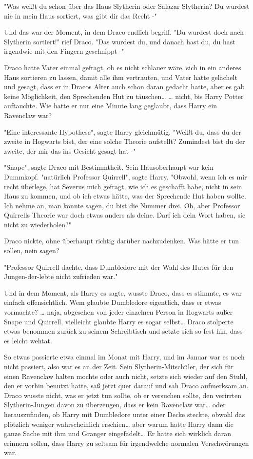 {"Was weißt du schon über das Haus Slytherin oder Salazar Slytherin? Du wurdest nie in mein Haus sortiert, was gibt dir das Recht -"

Und das war der Moment, in dem Draco endlich begriff. "Du wurdest doch nach Slytherin sortiert!" rief Draco. "Das wurdest du, und danach hast du, du hast irgendwie mit den Fingern geschnippt -"

Draco hatte Vater einmal gefragt, ob es nicht schlauer wäre, sich in ein anderes Haus sortieren zu lassen, damit alle ihm vertrauten, und Vater hatte gelächelt und gesagt, dass er in Dracos Alter auch schon daran gedacht hatte, aber es gab keine Möglichkeit, den Sprechenden Hut zu täuschen… … nicht, bis Harry Potter auftauchte. Wie hatte er nur eine Minute lang geglaubt, dass Harry ein Ravenclaw war?

"Eine interessante Hypothese", sagte Harry gleichmütig. "Weißt du, dass du der zweite in Hogwarts bist, der eine solche Theorie aufstellt? Zumindest bist du der zweite, der mir das ins Gesicht gesagt hat -"

"Snape", sagte Draco mit Bestimmtheit. Sein Hausoberhaupt war kein Dummkopf. "natürlich Professor Quirrell", sagte Harry. "Obwohl, wenn ich es mir recht überlege, hat Severus mich gefragt, wie ich es geschafft habe, nicht in sein Haus zu kommen, und ob ich etwas hätte, was der Sprechende Hut haben wollte. Ich nehme an, man könnte sagen, du bist die Nummer drei. Oh, aber Professor Quirrells Theorie war doch etwas anders als deine. Darf ich dein Wort haben, sie nicht zu wiederholen?"

Draco nickte, ohne überhaupt richtig darüber nachzudenken. Was hätte er tun sollen, nein sagen?

"Professor Quirrell dachte, dass Dumbledore mit der Wahl des Hutes für den Jungen-der-lebte nicht zufrieden war."

Und in dem Moment, als Harry es sagte, wusste Draco, dass es stimmte, es war einfach offensichtlich. Wem glaubte Dumbledore eigentlich, dass er etwas vormachte? … naja, abgesehen von jeder einzelnen Person in Hogwarts außer Snape und Quirrell, vielleicht glaubte Harry es sogar selbst… Draco stolperte etwas benommen zurück zu seinem Schreibtisch und setzte sich so fest hin, dass es leicht wehtat.

So etwas passierte etwa einmal im Monat mit Harry, und im Januar war es noch nicht passiert, also war es an der Zeit. Sein Slytherin-Mitschüler, der sich für einen Ravenclaw halten mochte oder auch nicht, setzte sich wieder auf den Stuhl, den er vorhin benutzt hatte, saß jetzt quer darauf und sah Draco aufmerksam an. Draco wusste nicht, was er jetzt tun sollte, ob er versuchen sollte, den verirrten Slytherin-Jungen davon zu überzeugen, dass er kein Ravenclaw war… oder herauszufinden, ob Harry mit Dumbledore unter einer Decke steckte, obwohl das plötzlich weniger wahrscheinlich erschien… aber warum hatte Harry dann die ganze Sache mit ihm und Granger eingefädelt… Er hätte sich wirklich daran erinnern sollen, dass Harry zu seltsam für irgendwelche normalen Verschwörungen war.

}
